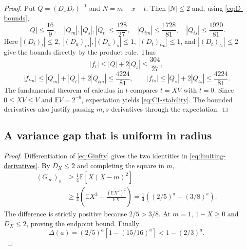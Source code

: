 \documentclass[11pt,letterpaper]{article}
\numberwithin{equation}{section}
\newtheorem{lemma}[theorem]{Lemma}
\theoremstyle{definition}
\theoremstyle{remark}
\newcommand{\E}{\mathbb E}
\begin{document}
\begin{proof}
Put $Q=(D_xD_t)^{-1}$ and $N=m-x-t$. Then $|N|\le2$ and,
using \eqref{eq:D-bounds},
\[
 |Q|\le\frac{16}{9},\quad
 |Q_m|,|Q_s|,|Q_t|\le\frac{128}{27},\quad
 |Q_{tm}|\le\frac{1728}{81},\quad
 |Q_{ts}|\le\frac{1920}{81}.
\]
Here $|(D_t)_t|\le2$, $|(D_u)_m|,|(D_u)_s|\le1$,
$|(D_t)_{tm}|\le1$, and $|(D_t)_{ts}|\le2$ give the bounds directly
by the product rule. Thus
\[
 |f_t|\le |Q|+2|Q_t|\le\frac{304}{27},
\]
\[
 |f_{tm}|\le |Q_m|+|Q_t|+2|Q_{tm}|
 \le\frac{4224}{81},\qquad
 |f_{ts}|\le |Q_s|+2|Q_{ts}|\le\frac{4224}{81}.
\]
The fundamental theorem of calculus in $t$ compares $t=XV$ with
$t=0$. Since $0\le XV\le V$ and $\E V=2^{-b}$, expectation yields
\eqref{eq:C1-stability}. The bounded derivatives also justify passing
$m,s$ derivatives through the expectation.
\end{proof}

\subsection{A variance gap that is uniform in radius}
\begin{proof}
Differentiation of \eqref{eq:Ginfty} gives the two identities in
\eqref{eq:limiting-derivatives}. By $D_X\le2$ and completing the
square in $m$,
\begin{align*}
 (G_\infty)_s
 &\ge\frac14\E[X(X-m)^2]\\
 &\ge\frac14\left(\E X^3-\frac{(\E X^2)^2}{\E X}\right)
 =\frac14\left((2/5)^a-(3/8)^a\right).
\end{align*}
The difference is strictly positive because $2/5>3/8$.
At $m=1$, $1-X\ge0$ and $D_X\le2$, proving the endpoint bound.
Finally
\[
 \Delta(a)=(2/5)^a[1-(15/16)^a]<1-(2/3)^a.
\]
\end{proof}
\end{document}
